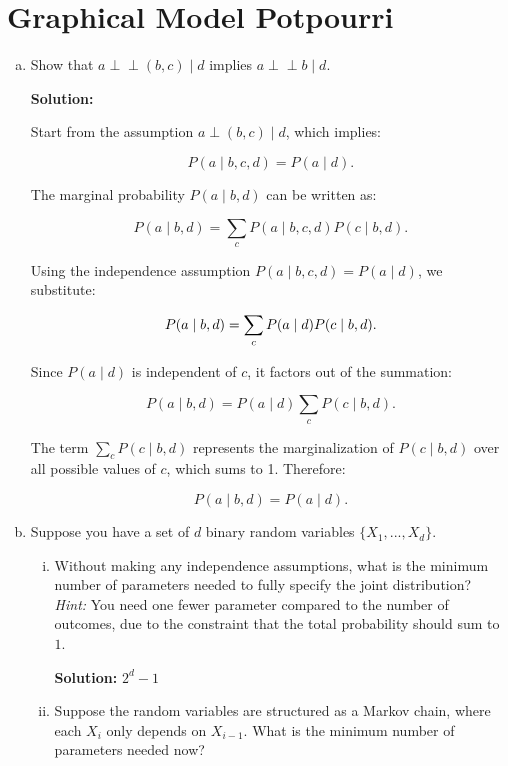 \documentclass{article}
\newcommand{\Question}[1]{\Large \section{ #1 } \normalsize}
\newcommand{\statind}{\perp\!\!\!\perp}
\newenvironment{solution}{\color{blue} \smallskip \textbf{Solution:}}{}
\begin{document}
\newpage
\Question{Graphical Model Potpourri}
\begin{enumerate}[(a)]
    \item
    Show that $a \statind (b, c) \mid d$ implies $a \statind b \mid d$.

    \begin{solution}

Start from the assumption \( a \perp (b, c) \mid d \), which implies:

\[
P(a \mid b, c, d) = P(a \mid d).
\]

The marginal probability \( P(a \mid b, d) \) can be written as:

\[
P(a \mid b, d) = \sum_{c} P(a \mid b, c, d) P(c \mid b, d).
\]

Using the independence assumption \( P(a \mid b, c, d) = P(a \mid d) \), we substitute:

\[
P(a \mid b, d) = \sum_{c} P(a \mid d) P(c \mid b, d).\\
\]


Since \( P(a \mid d) \) is independent of \( c \), it factors out of the summation:

\[
P(a \mid b, d) = P(a \mid d) \sum_{c} P(c \mid b, d).
\]


The term \( \sum_{c} P(c \mid b, d) \) represents the marginalization of \( P(c \mid b, d) \) over all possible values of \( c \), which sums to 1. Therefore:

\[
P(a \mid b, d) = P(a \mid d).
\]




    \end{solution}

    \newpage
    \item 
    Suppose you have a set of $d$ binary random variables $\{X_1, ..., X_d\}$.
    \begin{enumerate}[(i)]
        \item 
        Without making any independence assumptions, what is the minimum number of parameters needed to fully specify the joint distribution? \\
        \textit{Hint:} You need one fewer parameter compared to the number of outcomes, due to the constraint that the total probability should sum to $1$.

        \begin{solution}
            $2^d - 1$
        \end{solution}
        
        \item 
        Suppose the random variables are structured as a Markov chain, where each $X_i$ only depends on $X_{i-1}$. What is the minimum number of parameters needed now?


\end{enumerate}
\end{enumerate}
\end{document}
